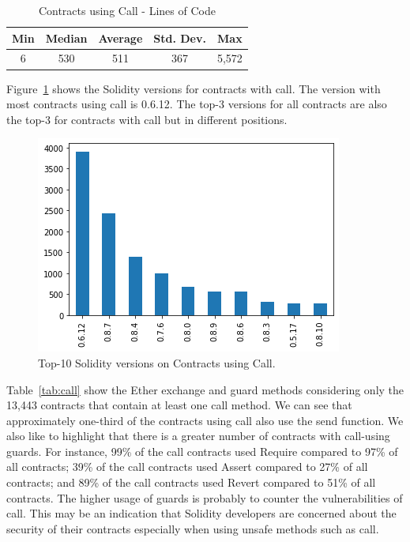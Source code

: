 \documentclass[10pt,conference]{IEEEtran}
\begin{document}
\begin{table}[h]
\center
  \caption{Contracts using Call - Lines of Code}
  \label{tab:call-loc}
  \begin{tabular}{c c c c c}
    \hline
    Min & Median & Average & Std. Dev. & Max \\
    \hline
   6 & 530 & 511 & 367 & 5,572 \\
  \hline
\end{tabular}
\end{table}

Figure~\ref{fig:call_version} shows the Solidity versions for contracts with call. The version with most contracts using call is 0.6.12.  The top-3 versions for all contracts are also the top-3 for contracts with call but in different positions. 

\begin{figure}[h]
  \centering
  \includegraphics[width=\linewidth]{img/call_clean_v2.png}
  \caption{Top-10 Solidity versions on Contracts using Call. }
  \label{fig:call_version}
\end{figure}

Table~\ref{tab:call} show the Ether exchange and guard methods considering only the 13,443 contracts that contain at least one call method. We can see that approximately one-third of the contracts using call also use the send function. We also like to highlight that there is a greater number of contracts with call-using guards. For instance, 99\% of the call contracts used Require compared to 97\% of all contracts; 39\% of the call contracts used Assert compared to 27\% of all contracts; and 89\% of the call contracts used Revert compared to 51\% of all contracts. The higher usage of guards is probably to counter the vulnerabilities of call. This may be an indication that Solidity developers are concerned about the security of their contracts especially when using unsafe methods such as call.
\end{document}

